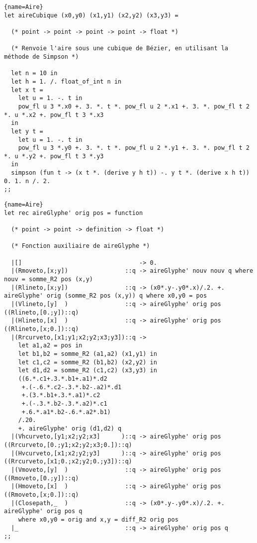 \documentclass[10pt,twoside,a4paper]{article}
\begin{document}
\begin{lstlisting}{name=Aire}
let aireCubique (x0,y0) (x1,y1) (x2,y2) (x3,y3) =

  (* point -> point -> point -> point -> float *)

  (* Renvoie l'aire sous une cubique de Bézier, en utilisant la méthode de Simpson *)
  
  let n = 10 in
  let h = 1. /. float_of_int n in
  let x t =
    let u = 1. -. t in
    pow_fl u 3 *.x0 +. 3. *. t *. pow_fl u 2 *.x1 +. 3. *. pow_fl t 2 *. u *.x2 +. pow_fl t 3 *.x3
  in
  let y t =
    let u = 1. -. t in
    pow_fl u 3 *.y0 +. 3. *. t *. pow_fl u 2 *.y1 +. 3. *. pow_fl t 2 *. u *.y2 +. pow_fl t 3 *.y3
  in
  simpson (fun t -> (x t *. (derive y h t)) -. y t *. (derive x h t)) 0. 1. n /. 2.
;;
\end{lstlisting}
\lstset{frame=single}\pagebreak
\begin{lstlisting}{name=Aire}
let rec aireGlyphe' orig pos = function

  (* point -> point -> definition -> float *)

  (* Fonction auxiliaire de aireGlyphe *)

  |[]                                 -> 0.
  |(Rmoveto,[x;y])                ::q -> aireGlyphe' nouv nouv q where nouv = somme_R2 pos (x,y)
  |(Rlineto,[x;y])                ::q -> (x0*.y-.y0*.x)/.2. +. aireGlyphe' orig (somme_R2 pos (x,y)) q where x0,y0 = pos
  |(Vlineto,[y]  )                ::q -> aireGlyphe' orig pos ((Rlineto,[0.;y])::q)
  |(Hlineto,[x]  )                ::q -> aireGlyphe' orig pos ((Rlineto,[x;0.])::q)
  |(Rrcurveto,[x1;y1;x2;y2;x3;y3])::q ->
    let a1,a2 = pos in
    let b1,b2 = somme_R2 (a1,a2) (x1,y1) in
    let c1,c2 = somme_R2 (b1,b2) (x2,y2) in
    let d1,d2 = somme_R2 (c1,c2) (x3,y3) in
    ((6.*.c1+.3.*.b1+.a1)*.d2
     +.(-.6.*.c2-.3.*.b2-.a2)*.d1
     +.(3.*.b1+.3.*.a1)*.c2
     +.(-.3.*.b2-.3.*.a2)*.c1
     +.6.*.a1*.b2-.6.*.a2*.b1)
    /.20.
    +. aireGlyphe' orig (d1,d2) q
  |(Vhcurveto,[y1;x2;y2;x3]      )::q -> aireGlyphe' orig pos ((Rrcurveto,[0.;y1;x2;y2;x3;0.])::q)
  |(Hvcurveto,[x1;x2;y2;y3]      )::q -> aireGlyphe' orig pos ((Rrcurveto,[x1;0.;x2;y2;0.;y3])::q)
  |(Vmoveto,[y]  )                ::q -> aireGlyphe' orig pos ((Rmoveto,[0.;y])::q)
  |(Hmoveto,[x]  )                ::q -> aireGlyphe' orig pos ((Rmoveto,[x;0.])::q)
  |(Closepath,_  )                ::q -> (x0*.y-.y0*.x)/.2. +. aireGlyphe' orig pos q
    where x0,y0 = orig and x,y = diff_R2 orig pos
  |_                              ::q -> aireGlyphe' orig pos q
;;
\end{lstlisting}
\end{document}
